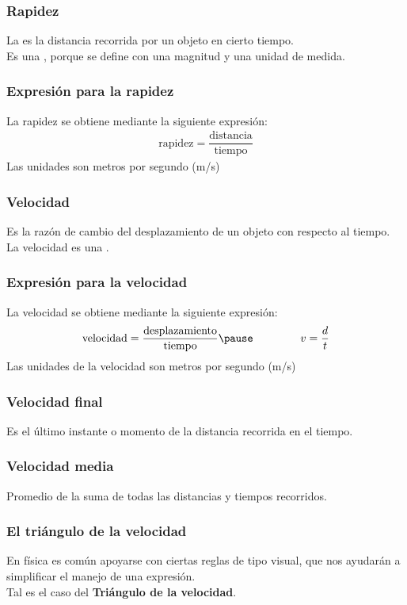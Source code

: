 \documentclass[14pt]{beamer}
\begin{document}
\begin{frame}
\frametitle{Rapidez}
La  es la distancia recorrida por un objeto en cierto tiempo.
\\
\bigskip
\pause
Es una , porque se define con una magnitud y una unidad de medida.
\end{frame}
\begin{frame}
\frametitle{Expresión para la rapidez}
La rapidez se obtiene mediante la siguiente expresión:
\pause
\begin{align*}
\text{rapidez} = \dfrac{\text{distancia}}{\text{tiempo}}
\end{align*}
Las unidades son metros por segundo (\unit[per-mode=symbol]{\meter\per\second})
\end{frame}
\begin{frame}
\frametitle{Velocidad}
Es la razón de cambio del desplazamiento de un objeto con respecto al tiempo.
\\
\bigskip
\pause
La velocidad es una .
\end{frame}
\begin{frame}
\frametitle{Expresión para la velocidad}
La velocidad se obtiene mediante la siguiente expresión:
\pause
\begin{eqnarray*}
\begin{aligned}
\text{velocidad} = \dfrac{\text{desplazamiento}}{\text{tiempo}} \pause \hspace*{1.5cm} v = \dfrac{d}{t}
\end{aligned}
\end{eqnarray*}
\pause
Las unidades de la velocidad son metros por segundo (\unit[per-mode=symbol]{\meter\per\second})
\end{frame}
\begin{frame}
\frametitle{Velocidad final}
Es el último instante o momento de la distancia recorrida en el tiempo.
\end{frame}
\begin{frame}
\frametitle{Velocidad media}
Promedio de la suma de todas las distancias y tiempos recorridos.
\end{frame}
\begin{frame}
\frametitle{El triángulo de la velocidad}
En física es común apoyarse con ciertas reglas de tipo visual, que nos ayudarán a simplificar el manejo de una expresión.
\\
\bigskip
\pause
Tal es el caso del \textbf{Triángulo de la velocidad}.
\end{frame}
\end{document}
